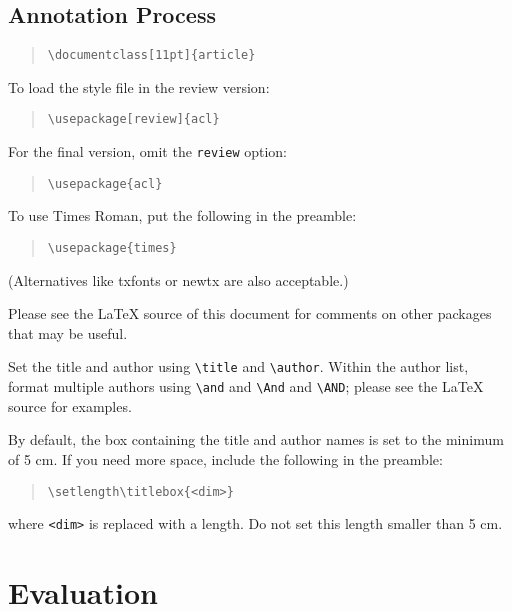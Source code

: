 \documentclass[11pt]{article}
\begin{document}
\subsection{Annotation Process}


\begin{quote}
\begin{verbatim}
\documentclass[11pt]{article}
\end{verbatim}
\end{quote}

To load the style file in the review version:
\begin{quote}
\begin{verbatim}
\usepackage[review]{acl}
\end{verbatim}
\end{quote}
For the final version, omit the \verb|review| option:
\begin{quote}
\begin{verbatim}
\usepackage{acl}
\end{verbatim}
\end{quote}

To use Times Roman, put the following in the preamble:
\begin{quote}
\begin{verbatim}
\usepackage{times}
\end{verbatim}
\end{quote}
(Alternatives like txfonts or newtx are also acceptable.)

Please see the \LaTeX{} source of this document for comments on other packages that may be useful.

Set the title and author using \verb|\title| and \verb|\author|. Within the author list, format multiple authors using \verb|\and| and \verb|\And| and \verb|\AND|; please see the \LaTeX{} source for examples.

By default, the box containing the title and author names is set to the minimum of 5 cm. If you need more space, include the following in the preamble:
\begin{quote}
\begin{verbatim}
\setlength\titlebox{<dim>}
\end{verbatim}
\end{quote}
where \verb|<dim>| is replaced with a length. Do not set this length smaller than 5 cm.

\section{Evaluation}
\end{document}
